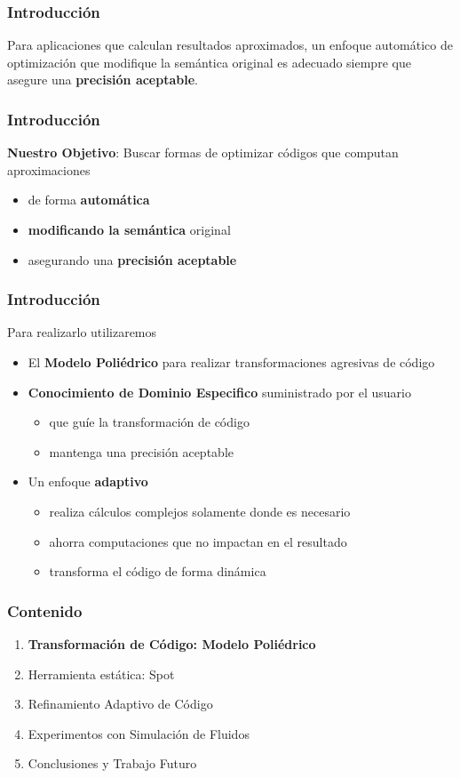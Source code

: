 \documentclass{beamer}\usetheme{Madrid} %
\begin{document}
\begin{frame}
\frametitle{Introducción}

Para aplicaciones que calculan resultados aproximados, un enfoque automático 
de optimización que modifique la semántica original es adecuado siempre
que asegure una \textbf{precisión aceptable}.

\end{frame} 
\begin{frame}
\frametitle{Introducción}
\textbf{Nuestro Objetivo}: Buscar formas de optimizar códigos que computan
aproximaciones 
\begin{itemize} 
\item de forma \textbf{automática}
\item \textbf{modificando la semántica} original
\item asegurando una \textbf{precisión aceptable} 
\end{itemize}
\end{frame}
\begin{frame}
\frametitle{Introducción}
Para realizarlo utilizaremos
\begin{itemize} 
\item El \textbf{Modelo Poliédrico} para realizar transformaciones agresivas de código
\item \textbf{Conocimiento de Dominio Especifico} suministrado por el usuario
	\begin{itemize} 
	\item que guíe la transformación de código	
	\item mantenga una precisión aceptable
\end{itemize}
\item Un enfoque \textbf{adaptivo}
	\begin{itemize} 
		\item realiza cálculos complejos solamente donde es necesario
		\item ahorra computaciones que no impactan en el resultado
		\item transforma el código de forma dinámica
	\end{itemize}
\end{itemize}
\end{frame}
\begin{frame} 
\frametitle{Contenido} 
\begin{enumerate}
\item \textbf{Transformación de Código: Modelo Poliédrico}
\item Herramienta estática: Spot
\item Refinamiento Adaptivo de Código
\item Experimentos con Simulación de Fluidos
\item Conclusiones y Trabajo Futuro
\end{enumerate}
\end{frame} 
\end{document}
